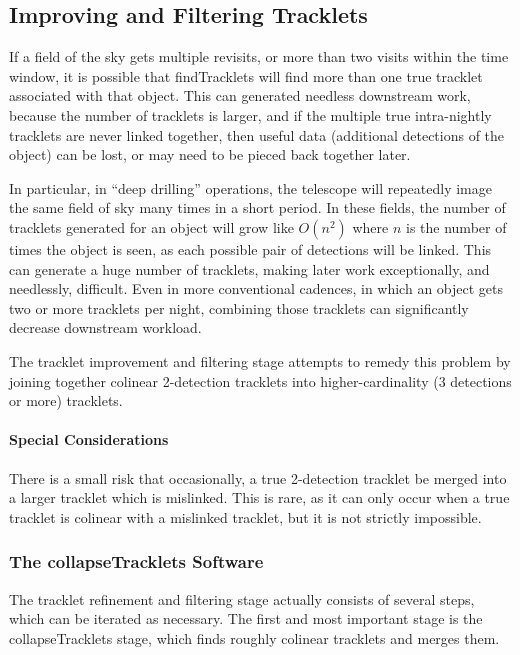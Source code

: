 \subsection{Improving and Filtering Tracklets} \label{collapseTracklets}
If a field of the sky gets multiple revisits, or more than two visits
within the time window, it is possible that findTracklets will find
more than one true tracklet associated with that object.  This can
generated needless downstream work, because the number of tracklets is
larger, and if the multiple true intra-nightly tracklets are never
linked together, then useful data (additional detections of the
object) can be lost, or may need to be pieced back together later.

In particular, in ``deep drilling'' operations, the telescope will
repeatedly image the same field of sky many times in a short period.
In these fields, the number of tracklets generated for an object will
grow like $O(n^2)$ where $n$ is the number of times the object is
seen, as each possible pair of detections will be linked.  This can
generate a huge number of tracklets, making later work exceptionally,
and needlessly, difficult.  Even in more conventional cadences, in
which an object gets two or more tracklets per night, combining those
tracklets can significantly decrease downstream workload.

The tracklet improvement and filtering stage attempts to remedy this
problem by joining together colinear 2-detection tracklets into
higher-cardinality (3 detections or more) tracklets.


\paragraph{Special Considerations}
There is a small risk that occasionally, a true 2-detection tracklet
be merged into a larger tracklet which is mislinked.  This is rare, as
it can only occur when a true tracklet is colinear with a mislinked
tracklet, but it is not strictly impossible.



\subsubsection{The collapseTracklets Software} 

The tracklet refinement and filtering stage actually consists of
several steps, which can be iterated as necessary.  The first and most
important stage is the collapseTracklets stage, which finds roughly
colinear tracklets and merges them.  

